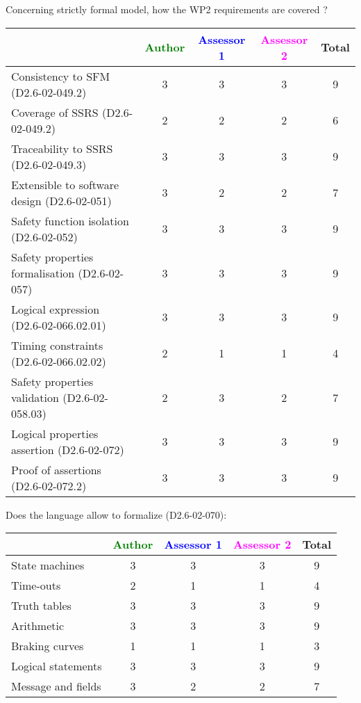 Concerning strictly formal model, how the WP2 requirements are covered ?

\begin{tabular}{|l | c | c | c | c|}
\hline
& \textcolor{green}{Author} & \textcolor{blue}{Assessor 1} & \textcolor{magenta}{Assessor 2} & Total \\
\hline 
Consistency to SFM (D2.6-02-049.2) & 3 & 3 & 3 & 9 \\
\hline
Coverage of SSRS (D2.6-02-049.2)  & 2 & 2 & 2 & 6 \\
\hline
Traceability to  SSRS (D2.6-02-049.3)  & 3 & 3 & 3 & 9 \\
\hline
Extensible to software design (D2.6-02-051)  & 3 & 2 & 2 & 7 \\
\hline
Safety function isolation (D2.6-02-052)  & 3 & 3 & 3 & 9 \\
\hline 
Safety properties formalisation (D2.6-02-057)  & 3 & 3 & 3 & 9 \\
\hline
Logical expression (D2.6-02-066.02.01)  & 3 & 3 & 3 & 9 \\
\hline
Timing constraints (D2.6-02-066.02.02)  & 2 & 1 & 1 & 4 \\
\hline
Safety properties validation (D2.6-02-058.03)  & 2 & 3 & 2 & 7 \\
\hline
Logical properties assertion (D2.6-02-072)  & 3 & 3 & 3 & 9 \\
\hline
Proof of assertions (D2.6-02-072.2)  & 3 & 3 & 3 & 9 \\
\hline
\end{tabular}

Does the language allow to  formalize (D2.6-02-070):

\begin{tabular}{|l | c | c | c | c|}
\hline
& \textcolor{green}{Author} & \textcolor{blue}{Assessor 1} & \textcolor{magenta}{Assessor 2} & Total \\
\hline 
State machines  & 3 & 3 & 3 & 9 \\
\hline
Time-outs  & 2 & 1 & 1 & 4 \\
\hline
Truth tables  & 3 & 3 & 3 & 9 \\
\hline
Arithmetic  & 3 & 3 & 3 & 9 \\
\hline
Braking curves  & 1 & 1 & 1 & 3 \\
\hline
Logical statements & 3 & 3 & 3 & 9 \\
\hline
Message and fields & 3 & 2 & 2 & 7  \\
\hline
\end{tabular}

